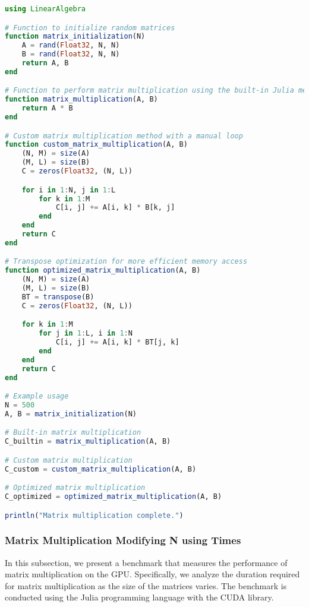\begin{comment}

\end{comment}

\begin{lstlisting}[language=Julia]
using LinearAlgebra

# Function to initialize random matrices
function matrix_initialization(N)
    A = rand(Float32, N, N)
    B = rand(Float32, N, N)
    return A, B
end

# Function to perform matrix multiplication using the built-in Julia method
function matrix_multiplication(A, B)
    return A * B
end

# Custom matrix multiplication method with a manual loop
function custom_matrix_multiplication(A, B)
    (N, M) = size(A)
    (M, L) = size(B)
    C = zeros(Float32, (N, L))

    for i in 1:N, j in 1:L
        for k in 1:M
            C[i, j] += A[i, k] * B[k, j]
        end
    end
    return C
end

# Transpose optimization for more efficient memory access
function optimized_matrix_multiplication(A, B)
    (N, M) = size(A)
    (M, L) = size(B)
    BT = transpose(B)
    C = zeros(Float32, (N, L))

    for k in 1:M
        for j in 1:L, i in 1:N
            C[i, j] += A[i, k] * BT[j, k]
        end
    end
    return C
end

# Example usage
N = 500
A, B = matrix_initialization(N)

# Built-in matrix multiplication
C_builtin = matrix_multiplication(A, B)

# Custom matrix multiplication
C_custom = custom_matrix_multiplication(A, B)

# Optimized matrix multiplication
C_optimized = optimized_matrix_multiplication(A, B)

println("Matrix multiplication complete.")
\end{lstlisting}



\subsubsection{Matrix Multiplication Modifying N using Times}

In this subsection, we present a benchmark that measures the performance of matrix multiplication on the GPU. Specifically, we analyze the duration required for matrix multiplication as the size of the matrices varies. The benchmark is conducted using the Julia programming language with the CUDA library.


